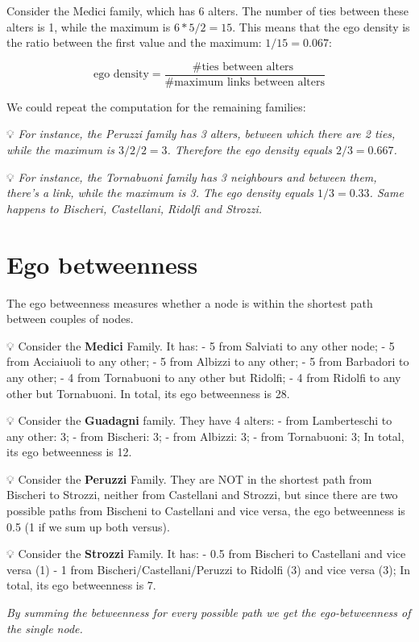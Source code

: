 \documentclass[
  notitlepage,
  onecolumn,
  openany]{book}
\begin{document}
Consider the Medici family, which has 6 alters. The number of ties between these alters is 1, while the maximum is \(6*5/2 = 15\). This means that the ego density is the ratio between the first value and the maximum: \(1/15 = 0.067\):

\[
\text{ego density} = \frac{ \text{\# ties between alters }}{\text{\# maximum links between alters}}
\]

We could repeat the computation for the remaining families:

💡 \emph{For instance, the Peruzzi family has 3 alters, between which there are 2 ties, while the maximum is \(3/2/2 = 3\). Therefore the ego density equals \(2/3 = 0.667\).}

💡 \emph{For instance, the Tornabuoni family has 3 neighbours and between them, there's a link, while the maximum is 3. The ego density equals \(1/3 = 0.33\). Same happens to Bischeri, Castellani, Ridolfi and Strozzi.}

\hypertarget{ego-betweenness}{%
\section{Ego betweenness}\label{ego-betweenness}}

The ego betweenness measures whether a node is within the shortest path between couples of nodes.

💡 Consider the \textbf{Medici} Family. It has:
- 5 from Salviati to any other node;
- 5 from Acciaiuoli to any other;
- 5 from Albizzi to any other;
- 5 from Barbadori to any other;
- 4 from Tornabuoni to any other but Ridolfi;
- 4 from Ridolfi to any other but Tornabuoni.
In total, its ego betweenness is 28.

💡 Consider the \textbf{Guadagni} family. They have 4 alters:
- from Lamberteschi to any other: 3;
- from Bischeri: 3;
- from Albizzi: 3;
- from Tornabuoni: 3;
In total, its ego betweenness is 12.

💡 Consider the \textbf{Peruzzi} Family. They are NOT in the shortest path from Bischeri to Strozzi, neither from Castellani and Strozzi, but since there are two possible paths from Bischeni to Castellani and vice versa, the ego betweenness is 0.5 (1 if we sum up both versus).

💡 Consider the \textbf{Strozzi} Family. It has:
- 0.5 from Bischeri to Castellani and vice versa (1)
- 1 from Bischeri/Castellani/Peruzzi to Ridolfi (3) and vice versa (3);
In total, its ego betweenness is 7.

\emph{By summing the betweenness for every possible path we get the ego-betweenness of the single node.}
\end{document}
